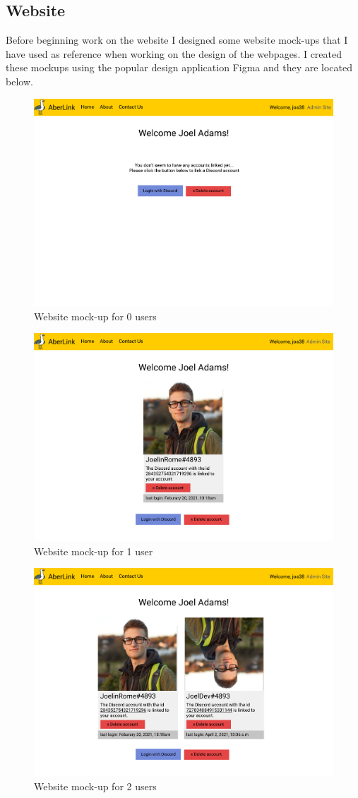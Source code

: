 \subsection{Website}
Before beginning work on the website I designed some website mock-ups that I have used as reference when working on the design of the webpages. I created these mockups using the popular design application Figma \cite{figma} and they are located below.
\begin{figure}[H]
	\centering
	\includegraphics[width=0.8\linewidth]{Figures/AberLink-web-0}
	\caption{Website mock-up for 0 users}
	\label{fig:web-mock-0}
\end{figure}
\begin{figure}[H]
	\centering
	\includegraphics[width=0.8\linewidth]{Figures/AberLink-web-1}
	\caption{Website mock-up for 1 user}
	\label{fig:web-mock-1}
\end{figure}
\begin{figure}[H]
	\centering
	\includegraphics[width=0.8\linewidth]{Figures/AberLink-web-2}
	\caption{Website mock-up for 2 users}
	\label{fig:web-mock-2}
\end{figure}


